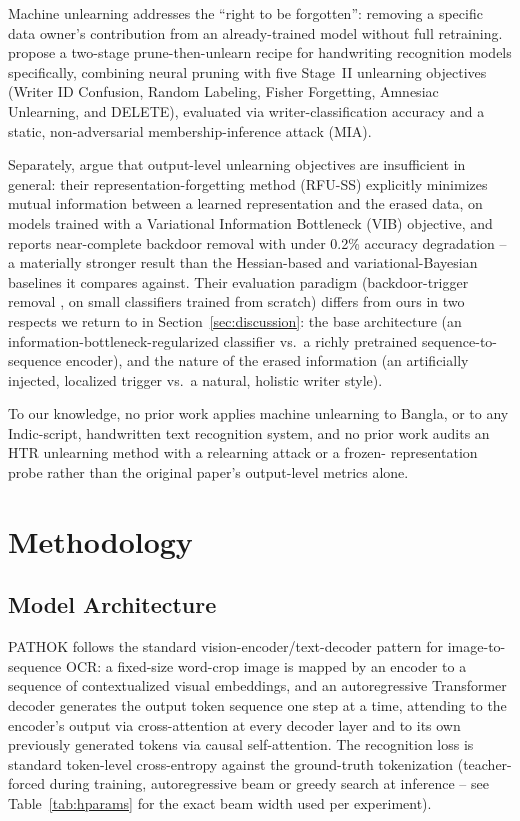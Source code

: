 \documentclass[a4paper,fleqn]{cas-dc}
\begin{document}
Machine unlearning addresses the ``right to be forgotten'': removing a
specific data owner's contribution from an already-trained model without
full retraining. \citet{kang2026privacy} propose a two-stage
prune-then-unlearn recipe for handwriting recognition models specifically,
combining neural pruning with five Stage~II unlearning objectives (Writer
ID Confusion, Random Labeling, Fisher Forgetting, Amnesiac Unlearning, and
DELETE), evaluated via writer-classification accuracy and a static,
non-adversarial membership-inference attack (MIA).

Separately, \citet{wang2026rfuss} argue that output-level unlearning
objectives are insufficient in general: their representation-forgetting
method (RFU-SS) explicitly minimizes mutual information between a learned
representation and the erased data, on models trained with a Variational
Information Bottleneck (VIB) objective, and reports near-complete backdoor
removal with under 0.2\% accuracy degradation -- a materially stronger
result than the Hessian-based and variational-Bayesian baselines it
compares against. Their evaluation paradigm (backdoor-trigger removal
\citep{hu2022backdooring}, on small classifiers trained from scratch)
differs from ours in two respects we return to in
Section~\ref{sec:discussion}: the base architecture (an
information-bottleneck-regularized classifier vs.\ a richly pretrained
sequence-to-sequence encoder), and the nature of the erased information
(an artificially injected, localized trigger vs.\ a natural, holistic
writer style).

To our knowledge, no prior work applies machine unlearning to Bangla, or to
any Indic-script, handwritten text recognition system, and no prior work
audits an HTR unlearning method with a relearning attack or a frozen-
representation probe rather than the original paper's output-level metrics
alone.

\section{Methodology}
\label{sec:methodology}

\subsection{Model Architecture}
\label{sec:arch}

PATHOK follows the standard vision-encoder/text-decoder pattern for
image-to-sequence OCR: a fixed-size word-crop image is mapped by an
encoder to a sequence of contextualized visual embeddings, and an
autoregressive Transformer decoder \citep{vaswani2017attention} generates
the output token sequence one step at a time, attending to the encoder's
output via cross-attention at every decoder layer and to its own
previously generated tokens via causal self-attention. The recognition
loss is standard token-level cross-entropy against the ground-truth
tokenization (teacher-forced during training, autoregressive beam or
greedy search at inference -- see Table~\ref{tab:hparams} for the exact
beam width used per experiment).
\end{document}
